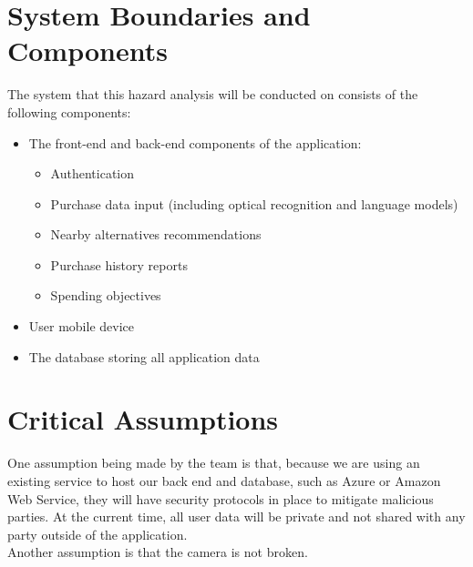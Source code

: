 \documentclass{article}
\begin{document}
\section{System Boundaries and Components}
The system that this hazard analysis will be conducted on consists of the following components:
\begin{itemize}
    \item The front-end and back-end components of the application:
        \begin{itemize}
            \item Authentication
            \item Purchase data input (including optical recognition and language models)
            \item Nearby alternatives recommendations
            \item Purchase history reports
            \item Spending objectives
        \end{itemize}
    \item User mobile device
    \item The database storing all application data
\end{itemize}

\section{Critical Assumptions}

One assumption being made by the team is that, because we are using an existing service to host our back end and database, such as Azure or Amazon Web Service, they will have security protocols in place to mitigate malicious parties. At the current time, all user data will be private and not shared with any party outside of the application.\\

\noindent Another assumption is that the camera is not broken.
\end{document}

